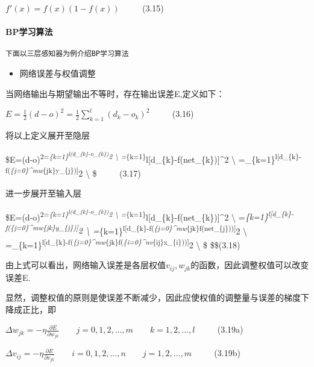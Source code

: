 \documentclass[11pt]{article}
\providecommand{\tightlist}{%
      \setlength{\itemsep}{0pt}\setlength{\parskip}{0pt}}
\begin{document}
\(f'(x)=f(x)(1-f(x))\) \(\qquad\) (3.15)

\paragraph{BP学习算法}\label{bpux5b66ux4e60ux7b97ux6cd5}

\begin{verbatim}
下面以三层感知器为例介绍BP学习算法
\end{verbatim}

\begin{itemize}
\tightlist
\item
  网络误差与权值调整
\end{itemize}

当网络输出与期望输出不等时，存在输出误差E,定义如下：

\(E=\frac{1}{2}(d-o)^2=\frac{1}{2}\sum_{k=1}^l(d_{k}-o_{k})^2\)
\(\qquad\) (3.16)

将以上定义展开至隐层

\$E=(d-o)\textsuperscript{2=\sum\emph{\{k=1\}\textsuperscript{l(d\_\{k\}-o\_\{k\})}2
\textbackslash{}
=\sum}\{k=1\}}l{[}d\_\{k\}-f(net\_\{k\}){]}\^{}2
\textbackslash{}
=\sum\_\{k=1\}\textsuperscript{l{[}d\_\{k\}-f(\sum\emph{\{j=0\}\^{}mw}\{jk\}y\_\{j\}){]}}2
\textbackslash{} \$ \(\qquad\) (3.17)

进一步展开至输入层

\$E=(d-o)\textsuperscript{2=\sum\emph{\{k=1\}\textsuperscript{l(d\_\{k\}-o\_\{k\})}2
\textbackslash{}
=\sum}\{k=1\}}l{[}d\_\{k\}-f(net\_\{k\}){]}\^{}2
\textbackslash{}
=\sum\emph{\{k=1\}\textsuperscript{l{[}d\_\{k\}-f(\sum\emph{\{j=0\}\^{}mw}\{jk\}y\_\{j\}){]}}2
\textbackslash{}
=\sum}\{k=1\}\textsuperscript{l{[}d\_\{k\}-f(\sum\emph{\{j=0\}\^{}mw}\{jk\}f(net\_\{j\})){]}}2
\textbackslash{}
=\sum\_\{k=1\}\textsuperscript{l{[}d\_\{k\}-f(\sum\emph{\{j=0\}\^{}mw}\{jk\}f(\sum\emph{\{i=0\}\^{}nv}\{ij\}x\_\{i\})){]}}2
\textbackslash{} \$ \$\qquad \$(3.18)

由上式可以看出，网络输入误差是各层权值\(v_{ij},w_{jk}\)的函数，因此调整权值可以改变误差E.

显然，调整权值的原则是使误差不断减少，因此应使权值的调整量与误差的梯度下降成正比，即

\(\Delta w_{jk}=-\eta \frac{\partial E}{\partial w_{jk}} \qquad j=0,1,2,...,m \qquad k=1,2,...,l\)
\(\qquad\) (3.19a)

\(\Delta v_{ij}=-\eta \frac{\partial E}{\partial v_{jk}} \qquad i=0,1,2,...,n \qquad j=1,2,...,m\)
\(\qquad\) (3.19b)
\end{document}

